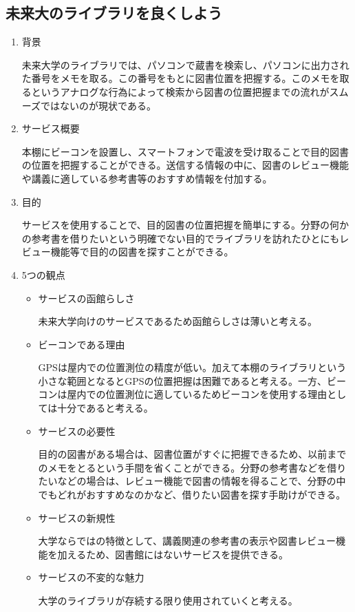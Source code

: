 \subsection{未来大のライブラリを良くしよう}
\begin{enumerate}
    \item 背景
    \par 未来大学のライブラリでは、パソコンで蔵書を検索し、パソコンに出力された番号をメモを取る。この番号をもとに図書位置を把握する。このメモを取るというアナログな行為によって検索から図書の位置把握までの流れがスムーズではないのが現状である。
    \item サービス概要
    \par 本棚にビーコンを設置し、スマートフォンで電波を受け取ることで目的図書の位置を把握することができる。送信する情報の中に、図書のレビュー機能や講義に適している参考書等のおすすめ情報を付加する。
    \item 目的
    \par サービスを使用することで、目的図書の位置把握を簡単にする。分野の何かの参考書を借りたいという明確でない目的でライブラリを訪れたひとにもレビュー機能等で目的の図書を探すことができる。
    \item 5つの観点
    \begin{itemize}
        \item サービスの函館らしさ
        \par 未来大学向けのサービスであるため函館らしさは薄いと考える。
        \item ビーコンである理由
        \par GPSは屋内での位置測位の精度が低い。加えて本棚のライブラリという小さな範囲となるとGPSの位置把握は困難であると考える。一方、ビーコンは屋内での位置測位に適しているためビーコンを使用する理由としては十分であると考える。
        \item サービスの必要性
        \par 目的の図書がある場合は、図書位置がすぐに把握できるため、以前までのメモをとるという手間を省くことができる。分野の参考書などを借りたいなどの場合は、レビュー機能で図書の情報を得ることで、分野の中でもどれがおすすめなのかなど、借りたい図書を探す手助けができる。
        \item サービスの新規性
        \par 大学ならではの特徴として、講義関連の参考書の表示や図書レビュー機能を加えるため、図書館にはないサービスを提供できる。
        \item サービスの不変的な魅力
        \par 大学のライブラリが存続する限り使用されていくと考える。
    \end{itemize}
\end{enumerate}

